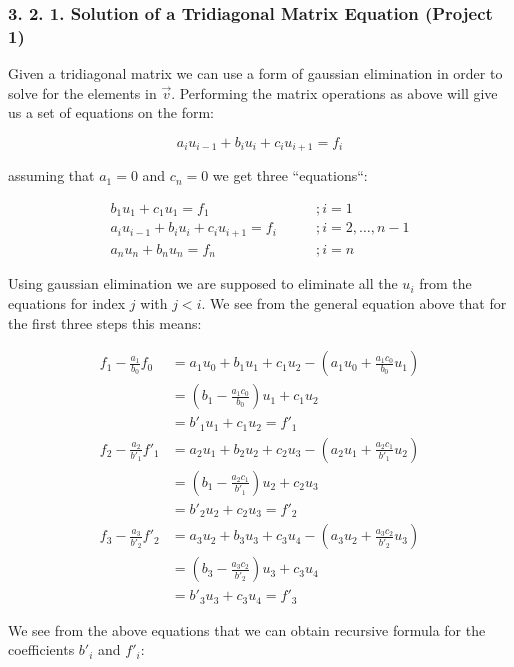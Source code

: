\documentclass[a4paper,11pt]{report}
\begin{document}
\subsubsection*{3. 2. 1. Solution of a Tridiagonal Matrix Equation (Project 1)}


Given a tridiagonal 
matrix we can use a form of gaussian elimination in order to solve 
for the elements in $\vec{v}$. Performing the matrix operations as
above will give us a set of equations on the form:

$$
a_{i}u_{i-1} + b_{i}u_{i} + c_{i}u_{i+1} = f_{i}
$$

assuming that $a_1 = 0$ and $c_{n} = 0$ we get three ``equations``:


\begin{align*}
b_{1}u_{1} + c_{1}u_{1} = f_{1} \qquad &; i = 1\\
a_{i}u_{i-1} + b_{i}u_{i} + c_{i}u_{i+1} = f_{i} \qquad &; i = 2, \ldots, n-1 \\
a_{n}u_{n} + b_{n}u_{n} = f_{n} \qquad &; i = n
\end{align*}

Using gaussian elimination we are supposed to eliminate all the $u_{i}$ from the equations
for index $j$ with $j < i$. We see from the general equation above that for the first 
three steps this means: 

\begin{align*}
f_1 - \frac{a_1}{b_0}f_0 &= a_1 u_0 + b_1 u_1 + c_1 u_2 - \left(a_1u_0 + \frac{a_1 c_0}{b_0} u_1 \right) \\
&= \left( b_1 - \frac{a_1 c_0}{b_0} \right) u_1 + c_1 u_2 \\ 
&= b'_1 u_1  + c_1 u_2 = f'_1 \\ 
f_2 - \frac{a_2}{b'_1}f'_1 &= a_2 u_1 + b_2 u_2 + c_2 u_3 - \left(a_2 u_1 + \frac{a_2 c_1}{b'_1} u_2 \right) \\ 
&= \left( b_1 - \frac{a_2 c_1}{b'_1} \right) u_2 + c_2 u_3 \\
&= b'_2 u_2 + c_2 u_3  = f'_2 \\
f_3 - \frac{a_3}{b'_2}f'_2 &= a_3 u_2 + b_3 u_3 + c_3 u_4 - \left( a_3 u_2 + \frac{a_3 c_2}{b'_2} u_3\right) \\
&= \left( b_3 - \frac{a_3 c_2}{b'_2} \right) u_3 + c_3 u_4 \\
&= b'_3 u_3 + c_3 u_4 = f'_3
\end{align*}

We see from the above equations that we can obtain recursive formula for the coefficients $b'_i$ and 
$f'_i$: 
\end{document}
